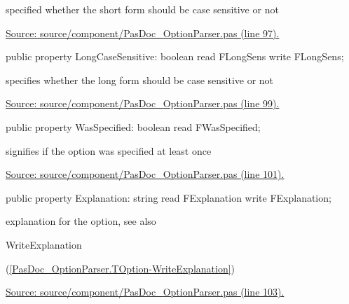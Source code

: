 \documentclass{report}
\newif\ifpdf
\begin{document}
\begin{list}{}
\begin{flushleft}
\ifpdf
\end{flushleft}
\fi


\par specified whether the short form should be case sensitive or not\par
\href{https://github.com/pasdoc/pasdoc/blob/master/source/component/PasDoc_OptionParser.pas#L97}{Source: source/component/PasDoc{\_}OptionParser.pas (line 97).}\label{PasDoc_OptionParser.TOption-LongCaseSensitive}
\item[\textbf{LongCaseSensitive}\hfill]
\ifpdf
\begin{flushleft}
\fi
\begin{ttfamily}
public property LongCaseSensitive: boolean read FLongSens write FLongSens;\end{ttfamily}

\ifpdf
\end{flushleft}
\fi


\par specifies whether the long form should be case sensitive or not\par
\href{https://github.com/pasdoc/pasdoc/blob/master/source/component/PasDoc_OptionParser.pas#L99}{Source: source/component/PasDoc{\_}OptionParser.pas (line 99).}\label{PasDoc_OptionParser.TOption-WasSpecified}
\item[\textbf{WasSpecified}\hfill]
\ifpdf
\begin{flushleft}
\fi
\begin{ttfamily}
public property WasSpecified: boolean read FWasSpecified;\end{ttfamily}

\ifpdf
\end{flushleft}
\fi


\par signifies if the option was specified at least once\par
\href{https://github.com/pasdoc/pasdoc/blob/master/source/component/PasDoc_OptionParser.pas#L101}{Source: source/component/PasDoc{\_}OptionParser.pas (line 101).}\label{PasDoc_OptionParser.TOption-Explanation}
\item[\textbf{Explanation}\hfill]
\ifpdf
\begin{flushleft}
\fi
\begin{ttfamily}
public property Explanation: string read FExplanation write FExplanation;\end{ttfamily}

\ifpdf
\end{flushleft}
\fi


\par explanation for the option, see also \begin{ttfamily}WriteExplanation\end{ttfamily}(\ref{PasDoc_OptionParser.TOption-WriteExplanation})\par
\href{https://github.com/pasdoc/pasdoc/blob/master/source/component/PasDoc_OptionParser.pas#L103}{Source: source/component/PasDoc{\_}OptionParser.pas (line 103).}\end{list}
\end{document}
